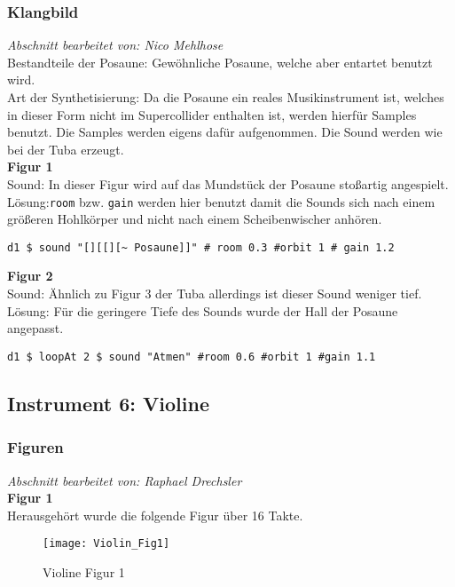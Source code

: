 \documentclass[
10pt, %
a4paper, %
oneside, %
headinclude,footinclude, %
BCOR5mm, %
]{scrartcl}
\begin{document}
\subsubsection{Klangbild}
\textit{Abschnitt bearbeitet von: Nico Mehlhose}\\

\noindent 
Bestandteile der Posaune: Gewöhnliche Posaune, welche aber entartet benutzt wird.\\
Art der Synthetisierung: Da die Posaune ein reales Musikinstrument ist, welches in dieser Form nicht im Supercollider enthalten ist,
werden hierfür Samples benutzt. Die Samples werden eigens dafür aufgenommen. Die Sound werden wie bei der Tuba erzeugt.\\

\noindent\textbf{Figur 1}\\
 Sound: In dieser Figur wird auf das Mundstück der Posaune stoßartig angespielt.\\
Lösung:\verb|room| bzw. \verb|gain| werden hier benutzt damit die Sounds sich nach einem größeren Hohlkörper und nicht nach einem Scheibenwischer anhören.
\begin{lstlisting}
d1 $ sound "[][[][~ Posaune]]" # room 0.3 #orbit 1 # gain 1.2
\end{lstlisting}

\noindent\textbf{Figur 2}\\
Sound: Ähnlich zu Figur 3 der Tuba allerdings ist dieser Sound weniger tief.\\
Lösung: Für die geringere Tiefe des Sounds wurde der Hall der Posaune angepasst.
\begin{lstlisting}
d1 $ loopAt 2 $ sound "Atmen" #room 0.6 #orbit 1 #gain 1.1
\end{lstlisting}

\subsection{Instrument 6: Violine}
\subsubsection{Figuren}
\textit{Abschnitt bearbeitet von: Raphael Drechsler}\\

\noindent\textbf{Figur 1}\\
Herausgehört wurde die folgende Figur über 16 Takte.
\begin{figure}[h]
	\centering 
	\texttt{[image: Violin\_Fig1]} 
	\caption{Violine Figur 1}
\end{figure}
\end{document}
